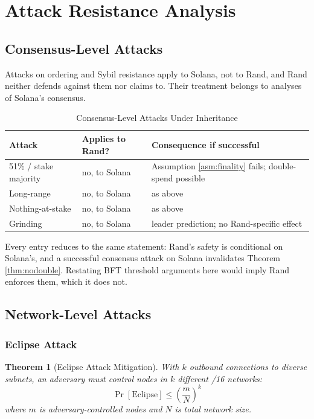 \documentclass[11pt,a4paper]{article}
\newtheorem{theorem}{Theorem}[section]
\begin{document}
\section{Attack Resistance Analysis}

\subsection{Consensus-Level Attacks}

Attacks on ordering and Sybil resistance apply to Solana, not to Rand, and Rand neither defends against them nor claims to. Their treatment belongs to analyses of Solana's consensus.

\begin{table}[h]
\centering
\caption{Consensus-Level Attacks Under Inheritance}
\begin{tabular}{@{}lll@{}}
\toprule
\textbf{Attack} & \textbf{Applies to Rand?} & \textbf{Consequence if successful} \\ \midrule
51\% / stake majority & no, to Solana & Assumption \ref{asm:finality} fails; double-spend possible \\
Long-range & no, to Solana & as above \\
Nothing-at-stake & no, to Solana & as above \\
Grinding & no, to Solana & leader prediction; no Rand-specific effect \\
\bottomrule
\end{tabular}
\end{table}

Every entry reduces to the same statement: Rand's safety is conditional on Solana's, and a successful consensus attack on Solana invalidates Theorem \ref{thm:nodouble}. Restating BFT threshold arguments here would imply Rand enforces them, which it does not.

\subsection{Network-Level Attacks}

\subsubsection{Eclipse Attack}

\begin{theorem}[Eclipse Attack Mitigation]
With $k$ outbound connections to diverse subnets, an adversary must control nodes in $k$ different /16 networks:
\[
\Pr[\text{Eclipse}] \leq \left(\frac{m}{N}\right)^k
\]
where $m$ is adversary-controlled nodes and $N$ is total network size.
\end{theorem}
\end{document}
